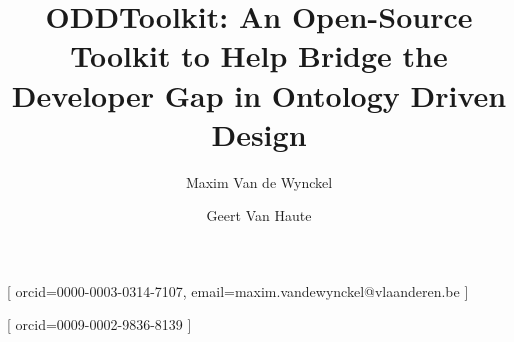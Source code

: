 \documentclass{ceurart}
\begin{document}
\title{ODDToolkit: An Open-Source Toolkit to Help Bridge the Developer Gap in Ontology Driven Design}

\author[a1]{Maxim {Van de Wynckel}}[%
orcid=0000-0003-0314-7107,
email=maxim.vandewynckel@vlaanderen.be
]
\cormark[1]
\author[a1]{Geert {Van Haute}}[%
orcid=0009-0002-9836-8139
]

\address[a1]{Department of Environment and Spatial Development, Flemish Government, Belgium}



\maketitle







\end{document}
